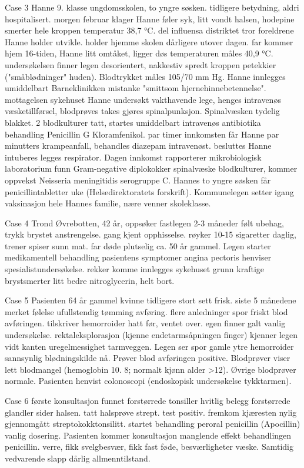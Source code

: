 Case 3
Hanne 9.
klasse ungdomsskolen, to yngre søsken.
tidligere betydning, aldri hospitalisert.
morgen februar klager Hanne føler syk, litt vondt halsen, hodepine smerter hele kroppen temperatur 38,7 °C.
del influensa distriktet tror foreldrene Hanne holder utvikle.
holder hjemme skolen dårligere utover dagen.
far kommer hjem 16-tiden, Hanne litt omtåket, ligger døs temperaturen måles 40,9 °C.
undersøkelsen finner legen desorientert, nakkestiv spredt kroppen petekkier ("småblødninger" huden).
Blodtrykket måles 105/70 mm Hg.
Hanne innlegges umiddelbart Barneklinikken mistanke "smittsom hjernehinnebetennelse".
mottagelsen sykehuset Hanne undersøkt vakthavende lege, henges intravenøs væsketillførsel, blodprøves takes gjøres spinalpunksjon.
Spinalvæsken tydelig blakket.
2 blodkulturer tatt, startes umiddelbart intravenøs antibiotika behandling Penicillin G Kloramfenikol.
par timer innkomsten får Hanne par minutters krampeanfall, behandles diazepam intravenøst.
besluttes Hanne intuberes legges respirator.
Dagen innkomst rapporterer mikrobiologisk laboratorium funn Gram-negative diplokokker spinalvæske blodkulturer, kommer oppvekst Neisseria meningitidis serogruppe C.
Hannes to yngre søsken får penicillintabletter uke (Helsedirektoratets forskrift).
Kommunelegen setter igang vaksinasjon hele Hannes familie, nære venner skoleklasse.

Case 4
Trond Øvrebotten, 42 år, oppsøker fastlegen 2-3 måneder følt ubehag, trykk brystet anstrengelse.
gang kjent opphisselse.
røyker 10-15 sigaretter daglig, trener spiser sunn mat.
far døde plutselig ca.
50 år gammel.
Legen starter medikamentell behandling pasientens symptomer angina pectoris henviser spesialistundersøkelse.
rekker komme innlegges sykehuset grunn kraftige brystsmerter litt bedre nitroglycerin, helt bort.

Case 5
Pasienten 64 år gammel kvinne tidligere stort sett frisk.
siste 5 månedene merket følelse ufullstendig tømming avføring.
flere anledninger spor friskt blod avføringen.
tilskriver hemorroider hatt før, ventet over.
egen finner galt vanlig undersøkelse.
rektaleksplorasjon (kjenne endetarmsåpningen finger) kjenner legen vidt kanten uregelmessighet tarmveggen.
Legen ser spor gamle ytre hemorroider sannsynlig blødningskilde nå.
Prøver blod avføringen positive.
Blodprøver viser lett blodmangel (hemoglobin 10.
8; normalt kjønn alder >12).
Øvrige blodprøver normale.
Pasienten henvist colonoscopi (endoskopisk undersøkelse tykktarmen).

Case 6
første konsultasjon funnet forstørrede tonsiller hvitlig belegg forstørrede glandler sider halsen.
tatt halsprøve strept.
test positiv.
fremkom kjæresten nylig gjennomgått streptokokktonsilitt.
startet behandling peroral penicillin (Apocillin) vanlig dosering.
Pasienten kommer konsultasjon manglende effekt behandlingen penicillin.
verre, fikk svelgbesvær, fikk fast føde, besværligheter væske.
Samtidig vedvarende slapp dårlig allmenntilstand.

